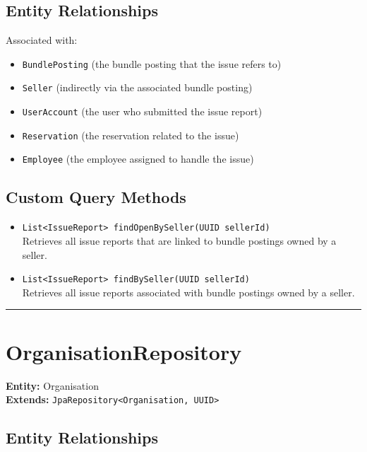 \documentclass[12pt]{article}
\begin{document}
\subsection*{Entity Relationships}
Associated with:
\begin{itemize}
    \item \texttt{BundlePosting} (the bundle posting that the issue refers to)
    \item \texttt{Seller} (indirectly via the associated bundle posting)
    \item \texttt{UserAccount} (the user who submitted the issue report)
    \item \texttt{Reservation} (the reservation related to the issue)
    \item \texttt{Employee} (the employee assigned to handle the issue)
\end{itemize}

\subsection*{Custom Query Methods}
\begin{itemize}
    \item \texttt{List<IssueReport> findOpenBySeller(UUID sellerId)} \\
    Retrieves all issue reports that are linked to bundle postings owned by a seller.



    
    \item \texttt{List<IssueReport> findBySeller(UUID sellerId)} \\
    Retrieves all issue reports associated with bundle postings owned by a seller.



    
\end{itemize}

\hrule
\vspace{1em}

\section{OrganisationRepository}

\textbf{Entity:} Organisation \\
\textbf{Extends:} \texttt{JpaRepository<Organisation, UUID>}

\subsection*{Entity Relationships}
\end{document}

